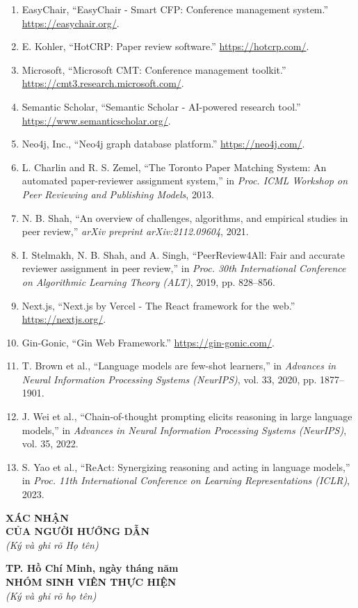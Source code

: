 \begin{enumerate}
  \renewcommand{\labelenumi}{[\arabic{enumi}]}
  \item EasyChair, ``EasyChair - Smart CFP: Conference management system.'' \url{https://easychair.org/}.
  \item E. Kohler, ``HotCRP: Paper review software.'' \url{https://hotcrp.com/}.
  \item Microsoft, ``Microsoft CMT: Conference management toolkit.'' \url{https://cmt3.research.microsoft.com/}.
  \item Semantic Scholar, ``Semantic Scholar - AI-powered research tool.'' \url{https://www.semanticscholar.org/}.
  \item Neo4j, Inc., ``Neo4j graph database platform.'' \url{https://neo4j.com/}.
  \item L. Charlin and R. S. Zemel, ``The Toronto Paper Matching System: An automated paper-reviewer assignment system,'' in \textit{Proc. ICML Workshop on Peer Reviewing and Publishing Models}, 2013.
  \item N. B. Shah, ``An overview of challenges, algorithms, and empirical studies in peer review,'' \textit{arXiv preprint arXiv:2112.09604}, 2021.
  \item I. Stelmakh, N. B. Shah, and A. Singh, ``PeerReview4All: Fair and accurate reviewer assignment in peer review,'' in \textit{Proc. 30th International Conference on Algorithmic Learning Theory (ALT)}, 2019, pp. 828--856.
  \item Next.js, ``Next.js by Vercel - The React framework for the web.'' \url{https://nextjs.org/}.
  \item Gin-Gonic, ``Gin Web Framework.'' \url{https://gin-gonic.com/}.
  \item T. Brown et al., ``Language models are few-shot learners,'' in \textit{Advances in Neural Information Processing Systems (NeurIPS)}, vol. 33, 2020, pp. 1877--1901.
  \item J. Wei et al., ``Chain-of-thought prompting elicits reasoning in large language models,'' in \textit{Advances in Neural Information Processing Systems (NeurIPS)}, vol. 35, 2022.
  \item S. Yao et al., ``ReAct: Synergizing reasoning and acting in language models,'' in \textit{Proc. 11th International Conference on Learning Representations (ICLR)}, 2023.
\end{enumerate}

\vspace{2\baselineskip}
\noindent
\begin{minipage}[t]{0.46\textwidth}
  \centering
  \textbf{XÁC NHẬN}\\
  \textbf{CỦA NGƯỜI HƯỚNG DẪN}\\
  \textit{(Ký và ghi rõ Họ tên)}
\end{minipage}
\hfill
\begin{minipage}[t]{0.46\textwidth}
  \centering
  \textbf{TP. Hồ Chí Minh, ngày \hspace{1em} tháng \hspace{1em} năm}\\
  \textbf{NHÓM SINH VIÊN THỰC HIỆN}\\
  \textit{(Ký và ghi rõ họ tên)}
\end{minipage}

\vspace{5\baselineskip}

